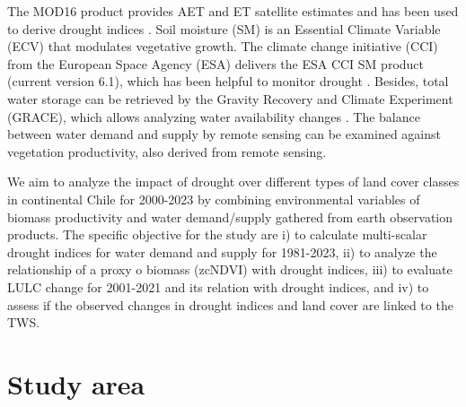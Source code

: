 \documentclass[
  number,
  preprint,
  3p]{elsarticle}
\begin{document}
The MOD16 product \citep{Running2021} provides AET and ET satellite
estimates and has been used to derive drought indices \citep{Mu2013}.
Soil moisture (SM) is an Essential Climate Variable (ECV) that modulates
vegetative growth. The climate change initiative (CCI) from the European
Space Agency (ESA) delivers the ESA CCI SM product \citep{Dorigo2017}
(current version 6.1), which has been helpful to monitor drought
\citep{Zhang2019}. Besides, total water storage can be retrieved by the
Gravity Recovery and Climate Experiment (GRACE), which allows analyzing
water availability changes \citep{Ahmed2014, Ma2017}. The balance
between water demand and supply by remote sensing can be examined
against vegetation productivity, also derived from remote sensing.

We aim to analyze the impact of drought over different types of land
cover classes in continental Chile for 2000-2023 by combining
environmental variables of biomass productivity and water demand/supply
gathered from earth observation products. The specific objective for the
study are i) to calculate multi-scalar drought indices for water demand
and supply for 1981-2023, ii) to analyze the relationship of a proxy o
biomass (zcNDVI) with drought indices, iii) to evaluate LULC change for
2001-2021 and its relation with drought indices, and iv) to assess if
the observed changes in drought indices and land cover are linked to the
TWS.

\hypertarget{study-area}{%
\section{Study area}\label{study-area}}
\end{document}

